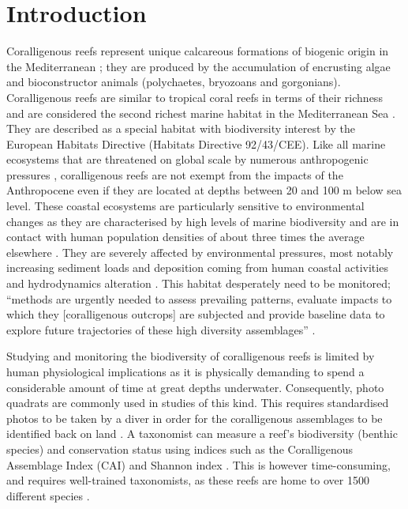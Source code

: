\section{Introduction}\label{chapitre1_1}
Coralligenous reefs represent unique calcareous formations of biogenic origin in the Mediterranean \citep{ballesteros_mediterranean_2006}; they are produced by the accumulation of encrusting algae and bioconstructor animals (polychaetes, bryozoans and gorgonians). Coralligenous reefs are similar to tropical coral reefs in terms of their richness and are considered the second richest marine habitat in the Mediterranean Sea \citep{boudouresque_marine_2004}. They are described as a special habitat with biodiversity interest by the European Habitats Directive (Habitats Directive 92/43/CEE). Like all marine ecosystems that are threatened on global scale by numerous anthropogenic pressures \citep{halpern_global_2008, hoekstra_confronting_2004}, coralligenous reefs are not exempt from the impacts of the Anthropocene \citep{mcgill_fifteen_2015} even if they are located at depths between 20 and 100 m below sea level. These coastal ecosystems are particularly sensitive to environmental changes as they are characterised by high levels of marine biodiversity \citep{halpern_global_2008} and are in contact with human population densities of about three times the average elsewhere \citep{small_global_2003}. They are severely affected by environmental pressures, most notably increasing sediment loads and deposition coming from human coastal activities and hydrodynamics alteration \citep{airoldi_effects_2003, ballesteros_mediterranean_2006}. This habitat desperately need to be monitored; “methods are urgently needed to assess prevailing patterns, evaluate impacts to which they [coralligenous outcrops] are subjected and provide baseline data to explore future trajectories of these high diversity assemblages” \citep{kipson_rapid_2011}.

Studying and monitoring the biodiversity of coralligenous reefs is limited by human physiological implications as it is physically demanding to spend a considerable amount of time at great depths underwater. Consequently, photo quadrats are commonly used in studies of this kind. This requires standardised photos to be taken by a diver in order for the coralligenous assemblages to be identified back on land \citep{deter_rapid_2012}. A taxonomist can measure a reef’s biodiversity (benthic species) and conservation status using indices such as the Coralligenous Assemblage Index (CAI) \citep{deter_preliminary_2012} and Shannon index \citep{magurran_measuring_2004}. This is however time-consuming, and requires well-trained taxonomists, as these reefs are home to over 1500 different species \citep{ballesteros_mediterranean_2006}. 

